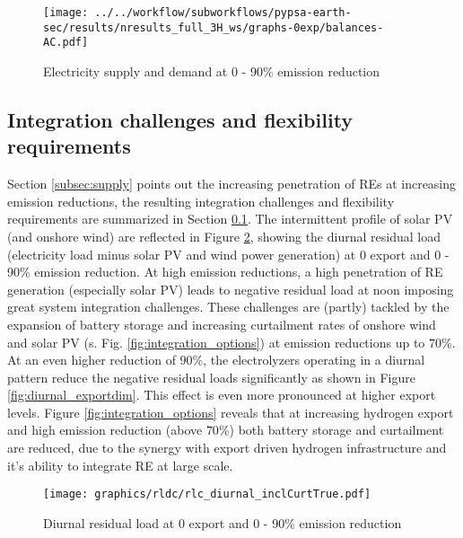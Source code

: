 
\begin{figure}[h!]
    \centering
    \texttt{[image: ../../workflow/subworkflows/pypsa-earth-sec/results/nresults\_full\_3H\_ws/graphs-0exp/balances-AC.pdf]}
    \caption{Electricity supply and demand at 0 - 90\% emission reduction}
    \label{fig:balances-ac-0exp}
\end{figure}


\subsection{Integration challenges and flexibility requirements}
\label{subsec:integration_challenges}
Section \ref{subsec:supply} points out the increasing penetration of REs at increasing emission reductions, the resulting integration challenges and flexibility requirements are summarized in Section \ref{subsec:integration_challenges}. The intermittent profile of solar PV (and onshore wind) are reflected in Figure \ref{fig:diurnal}, showing the diurnal residual load (electricity load minus solar PV and wind power generation) at 0 export and 0 - 90\% emission reduction. At high emission reductions, a high penetration of RE generation (especially solar PV) leads to negative residual load at noon imposing great system integration challenges. These challenges are (partly) tackled by the expansion of battery storage and increasing curtailment rates of onshore wind and solar PV (s. Fig. \ref{fig:integration_options}) at emission reductions up to $70$\%. At an even higher reduction of $90$\%, the electrolyzers operating in a diurnal pattern reduce the negative residual loads significantly as shown in Figure \ref{fig:diurnal_exportdim}. This effect is even more pronounced at higher export levels. Figure \ref{fig:integration_options} reveals that at increasing hydrogen export and high emission reduction (above $70$\%) both battery storage and curtailment are reduced, due to the synergy with export driven hydrogen infrastructure and it's ability to integrate RE at large scale.

\begin{figure}[h!]
    \centering
    \texttt{[image: graphics/rldc/rlc\_diurnal\_inclCurtTrue.pdf]}
    \caption{Diurnal residual load at 0 export and 0 - 90\% emission reduction}
    \label{fig:diurnal}
\end{figure}

